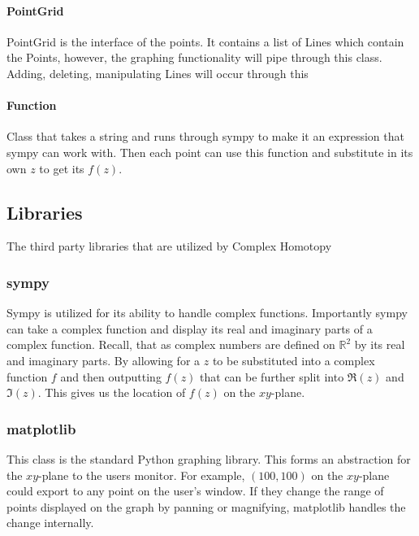\documentclass{article}
\begin{document}
            \paragraph{PointGrid}
            PointGrid is the interface of the points. It contains a list of Lines which contain the Points, however, the graphing functionality will pipe through this class. Adding, deleting, manipulating Lines will occur through this
            \paragraph{Function}
            Class that takes a string and runs through sympy to make it an expression that sympy can work with. Then each point can use this function and substitute in its own $z$ to get its $f(z)$.
    \subsection{Libraries}
    The third party libraries that are utilized by Complex Homotopy
        \subsubsection{sympy}
        Sympy is utilized for its ability to handle complex functions. Importantly sympy can take a complex function and display its real and imaginary parts of a complex function. Recall, that as complex numbers are defined on $\mathbb{R}^2$ by its real and imaginary parts. By allowing for a $z$ to be substituted into a complex function $f$ and then outputting $f(z)$ that can be further split into $\mathfrak{R}(z)$ and $\mathfrak{I}(z)$. This gives us the location of $f(z)$ on the $xy$-plane.
        \subsubsection{matplotlib}
        This class is the standard Python graphing library. This forms an abstraction for the $xy$-plane to the users monitor. For example, $(100,100)$ on the $xy$-plane could export to any point on the user's window. If they change the range of points displayed on the graph by panning or magnifying, matplotlib handles the change internally.
\end{document}
